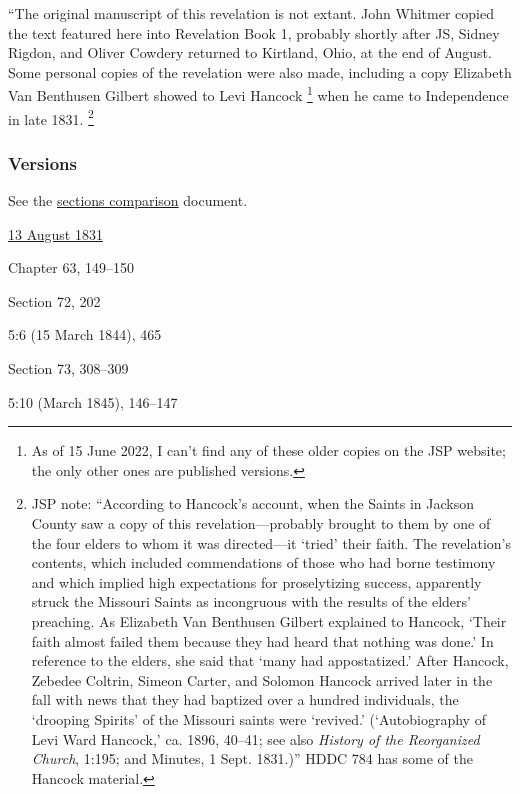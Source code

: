 			``The original manuscript of this revelation is not extant. John Whitmer copied the text featured here into Revelation Book 1, probably shortly after JS, Sidney Rigdon, and Oliver Cowdery returned to Kirtland, Ohio, at the end of August. Some personal copies of the revelation were also made, including a copy Elizabeth Van Benthusen Gilbert showed to Levi Hancock%
				\footnote{%
					As of 15 June 2022, I can't find any of these older copies on the JSP website; the only other ones are published versions.
					}
			when he came to Independence in late 1831.%
				\footnote{%
					JSP note: ``According to Hancock’s account, when the Saints in Jackson County saw a copy of this revelation---probably brought to them by one of the four elders to whom it was directed---it `tried' their faith. The revelation’s contents, which included commendations of those who had borne testimony and which implied high expectations for proselytizing success, apparently struck the Missouri Saints as incongruous with the results of the elders’ preaching. As Elizabeth Van Benthusen Gilbert explained to Hancock, `Their faith almost failed them because they had heard that nothing was done.' In reference to the elders, she said that `many had appostatized.' After Hancock, Zebedee Coltrin, Simeon Carter, and Solomon Hancock arrived later in the fall with news that they had baptized over a hundred individuals, the `drooping Spirits' of the Missouri saints were `revived.' (`Autobiography of Levi Ward Hancock,' ca. 1896, 40--41; see also \textit{History of the Reorganized Church}, 1:195; and Minutes, 1 Sept. 1831.)'' HDDC 784 has some of the Hancock material.
					}
		
	\subsubsection{Versions}
		\label{DC62-V}
		
		See the \href{https://drive.google.com/file/d/1goAvNz8jS4R8slYfMG_db55Ty2z_vmgK/view?usp=sharing}{sections comparison} document.
	
		\begin{compactdesc}
			\item[JSP] \hyperref[EMS-1831-JS-13-AUG-1831]{13 August 1831}
			\item[BC] Chapter 63, 149--150
			\item[DC 1835] Section 72, 202
			\item[TS] 5:6 (15 March 1844), 465
			\item[DC 1844] Section 73, 308--309
			\item[MS] 5:10 (March 1845), 146--147
		\end{compactdesc}

